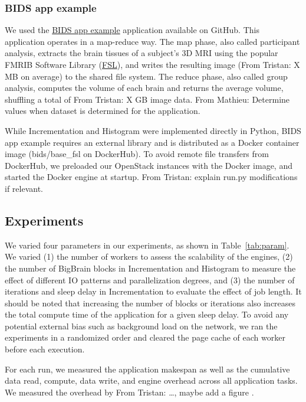 \documentclass[conference]{IEEEtran}
\newcommand{\TG}[1]{\color{cyan}From Tristan: #1 \color{black}}
\newcommand{\MD}[1]{\color{magenta}From Mathieu: #1 \color{black}}
\begin{document}
\subsubsection{BIDS app example}

We used the \href{https://github.com/BIDS-Apps/example}{BIDS app example}
application available on GitHub. This application operates in a map-reduce
way. The map phase, also called participant analysis, extracts the brain
tissues of a subject's 3D MRI using the popular FMRIB Software Library
(\href{https://fsl.fmrib.ox.ac.uk/fsl/fslwiki}{FSL}), and writes the
resulting image (\TG{X}MB on average) to the shared file system. The reduce
phase, also called group analysis, computes the volume of each brain and
returns the average volume, shuffling a total of \TG{X}GB image data.
\MD{Determine values when dataset is determined for the application.}

While Incrementation and Histogram were implemented directly in Python,
BIDS app example requires an external library and is distributed as a
Docker container image (bids/base\_fsl on DockerHub). To avoid remote file
transfers from DockerHub, we preloaded our OpenStack instances with the
Docker image, and started the Docker engine at startup. \TG{explain run.py modifications if relevant.}

\subsection{Experiments}

We varied four parameters in our experiments, as shown in
Table~\ref{tab:param}. We varied (1) the number of workers to assess the
scalability of the engines, (2) the number of BigBrain blocks in
Incrementation and Histogram to measure the effect of different IO patterns
and parallelization degrees, and (3) the number of iterations and sleep
delay in Incrementation to evaluate the effect of job length.
It should be noted that increasing the number of blocks or iterations also
increases the total compute time of the application for a given sleep
delay. To avoid any potential external bias such as background load on the
network, we ran the experiments in a randomized order and cleared the page
cache of each worker before each execution.

For each run, we measured the application makespan as well as the cumulative 
data read, compute, data write, and engine overhead across all application tasks. 
We measured the overhead by \TG{\ldots, maybe add a figure}.
\end{document}
